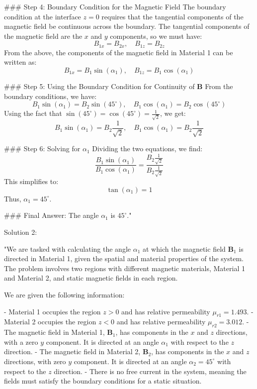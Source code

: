 ### Step 4: Boundary Condition for the Magnetic Field
The boundary condition at the interface $z = 0$ requires that the tangential components of the magnetic field be continuous across the boundary. The tangential components of the magnetic field are the $x$ and $y$ components, so we must have:
\[
B_{1x} = B_{2x}, \quad B_{1z} = B_{2z}
\]
From the above, the components of the magnetic field in Material 1 can be written as:
\[
B_{1x} = B_1 \sin(\alpha_1), \quad B_{1z} = B_1 \cos(\alpha_1)
\]

### Step 5: Using the Boundary Condition for Continuity of $\mathbf{B}$
From the boundary conditions, we have:
\[
B_1 \sin(\alpha_1) = B_2 \sin(45^\circ), \quad B_1 \cos(\alpha_1) = B_2 \cos(45^\circ)
\]
Using the fact that $\sin(45^\circ) = \cos(45^\circ) = \frac{1}{\sqrt{2}}$, we get:
\[
B_1 \sin(\alpha_1) = B_2 \frac{1}{\sqrt{2}}, \quad B_1 \cos(\alpha_1) = B_2 \frac{1}{\sqrt{2}}
\]

### Step 6: Solving for $\alpha_1$
Dividing the two equations, we find:
\[
\frac{B_1 \sin(\alpha_1)}{B_1 \cos(\alpha_1)} = \frac{B_2 \frac{1}{\sqrt{2}}}{B_2 \frac{1}{\sqrt{2}}}
\]
This simplifies to:
\[
\tan(\alpha_1) = 1
\]
Thus, $\alpha_1 = 45^\circ$.

### Final Answer:
The angle $\alpha_1$ is $45^\circ$."

Solution 2:

"We are tasked with calculating the angle $\alpha_1$ at which the magnetic field $\mathbf{B}_1$ is directed in Material 1, given the spatial and material properties of the system. The problem involves two regions with different magnetic materials, Material 1 and Material 2, and static magnetic fields in each region.

We are given the following information:

- Material 1 occupies the region $z > 0$ and has relative permeability $\mu_{r1} = 1.493$. 
- Material 2 occupies the region $z < 0$ and has relative permeability $\mu_{r2} = 3.012$.
- The magnetic field in Material 1, $\mathbf{B}_1$, has components in the $x$ and $z$ directions, with a zero $y$ component. It is directed at an angle $\alpha_1$ with respect to the $z$ direction.
- The magnetic field in Material 2, $\mathbf{B}_2$, has components in the $x$ and $z$ directions, with zero $y$ component. It is directed at an angle $\alpha_2 = 45^\circ$ with respect to the $z$ direction.
- There is no free current in the system, meaning the fields must satisfy the boundary conditions for a static situation.

